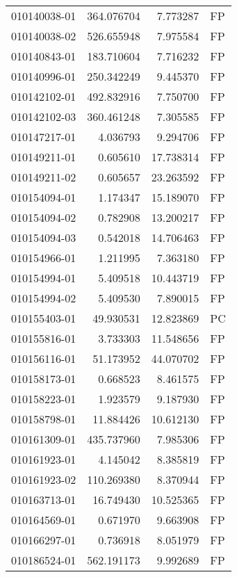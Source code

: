 \begin{tabular}{lrrl}
010140038-01 &  364.076704 &       7.773287 &   FP \\
010140038-02 &  526.655948 &       7.975584 &   FP \\
010140843-01 &  183.710604 &       7.716232 &   FP \\
010140996-01 &  250.342249 &       9.445370 &   FP \\
010142102-01 &  492.832916 &       7.750700 &   FP \\
010142102-03 &  360.461248 &       7.305585 &   FP \\
010147217-01 &    4.036793 &       9.294706 &   FP \\
010149211-01 &    0.605610 &      17.738314 &   FP \\
010149211-02 &    0.605657 &      23.263592 &   FP \\
010154094-01 &    1.174347 &      15.189070 &   FP \\
010154094-02 &    0.782908 &      13.200217 &   FP \\
010154094-03 &    0.542018 &      14.706463 &   FP \\
010154966-01 &    1.211995 &       7.363180 &   FP \\
010154994-01 &    5.409518 &      10.443719 &   FP \\
010154994-02 &    5.409530 &       7.890015 &   FP \\
010155403-01 &   49.930531 &      12.823869 &   PC \\
010155816-01 &    3.733303 &      11.548656 &   FP \\
010156116-01 &   51.173952 &      44.070702 &   FP \\
010158173-01 &    0.668523 &       8.461575 &   FP \\
010158223-01 &    1.923579 &       9.187930 &   FP \\
010158798-01 &   11.884426 &      10.612130 &   FP \\
010161309-01 &  435.737960 &       7.985306 &   FP \\
010161923-01 &    4.145042 &       8.385819 &   FP \\
010161923-02 &  110.269380 &       8.370944 &   FP \\
010163713-01 &   16.749430 &      10.525365 &   FP \\
010164569-01 &    0.671970 &       9.663908 &   FP \\
010166297-01 &    0.736918 &       8.051979 &   FP \\
010186524-01 &  562.191173 &       9.992689 &   FP \\

\end{tabular}
